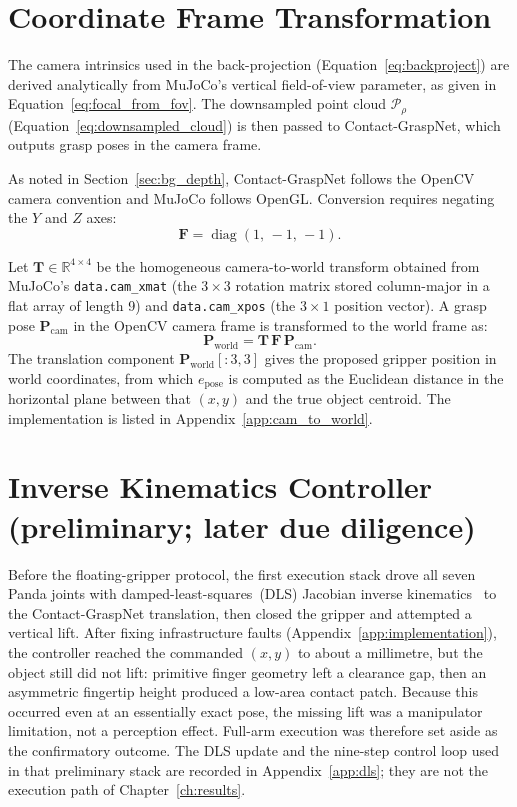 \documentclass[11pt,a4paper]{report}
\begin{document}
\section{Coordinate Frame Transformation}
\label{sec:frame_transform}

The camera intrinsics used in the back-projection (Equation~\eqref{eq:backproject}) are
derived analytically from MuJoCo's vertical field-of-view parameter, as given in
Equation~\eqref{eq:focal_from_fov}.  The downsampled point cloud $\mathcal{P}_\rho$
(Equation~\eqref{eq:downsampled_cloud}) is then passed to Contact-GraspNet, which
outputs grasp poses in the camera frame.

As noted in Section~\ref{sec:bg_depth}, Contact-GraspNet follows the OpenCV camera convention and MuJoCo follows OpenGL. Conversion requires negating the $Y$ and $Z$ axes:
\begin{equation}
  \mathbf{F} = \operatorname{diag}(1,\, -1,\, -1).
  \label{eq:flip}
\end{equation}

Let $\mathbf{T} \in \mathbb{R}^{4 \times 4}$ be the homogeneous camera-to-world transform obtained from MuJoCo's \texttt{data.cam\_xmat} (the $3 \times 3$ rotation matrix stored column-major in a flat array of length 9) and \texttt{data.cam\_xpos} (the $3 \times 1$ position vector). A grasp pose $\mathbf{P}_{\text{cam}}$ in the OpenCV camera frame is transformed to the world frame as:
\begin{equation}
  \mathbf{P}_{\text{world}} = \mathbf{T} \, \mathbf{F} \, \mathbf{P}_{\text{cam}}.
  \label{eq:transform}
\end{equation}
The translation component $\mathbf{P}_{\text{world}}[:3, 3]$ gives the proposed gripper position in world coordinates, from which $e_{\text{pose}}$ is computed as the Euclidean distance in the horizontal plane between that $(x,y)$ and the true object centroid. The implementation is listed in Appendix~\ref{app:cam_to_world}.

\section{Inverse Kinematics Controller (preliminary; later due diligence)}
\label{sec:ik_controller}

Before the floating-gripper protocol, the first execution stack drove all seven Panda joints with damped-least-squares~(DLS) Jacobian inverse kinematics~\cite{nakamura1986inverse} to the Contact-GraspNet translation, then closed the gripper and attempted a vertical lift. After fixing infrastructure faults (Appendix~\ref{app:implementation}), the controller reached the commanded $(x,y)$ to about a millimetre, but the object still did not lift: primitive finger geometry left a clearance gap, then an asymmetric fingertip height produced a low-area contact patch. Because this occurred even at an essentially exact pose, the missing lift was a manipulator limitation, not a perception effect. Full-arm execution was therefore set aside as the confirmatory outcome. The DLS update and the nine-step control loop used in that preliminary stack are recorded in Appendix~\ref{app:dls}; they are not the execution path of Chapter~\ref{ch:results}.
\end{document}
